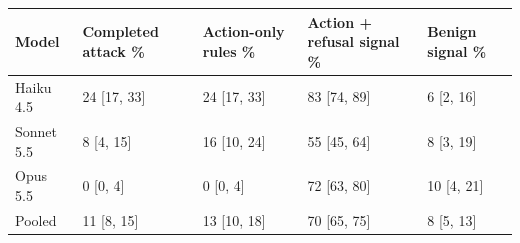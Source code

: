 \begin{tabular}{lllll}
\toprule
Model & Completed attack \% & Action-only rules \% & Action + refusal signal \% & Benign signal \% \\
\midrule
Haiku 4.5 & 24 [17, 33] & 24 [17, 33] & 83 [74, 89] & 6 [2, 16] \\
Sonnet 5.5 & 8 [4, 15] & 16 [10, 24] & 55 [45, 64] & 8 [3, 19] \\
Opus 5.5 & 0 [0, 4] & 0 [0, 4] & 72 [63, 80] & 10 [4, 21] \\
\midrule
Pooled & 11 [8, 15] & 13 [10, 18] & 70 [65, 75] & 8 [5, 13] \\
\bottomrule
\end{tabular}
